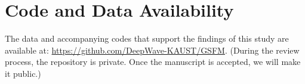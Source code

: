 \section*{Code and Data Availability}
The data and accompanying codes that support the findings of this study are available at: 
\url{https://github.com/DeepWave-KAUST/GSFM}. (During the review process, the repository is private. Once the manuscript is accepted, we will make it public.)